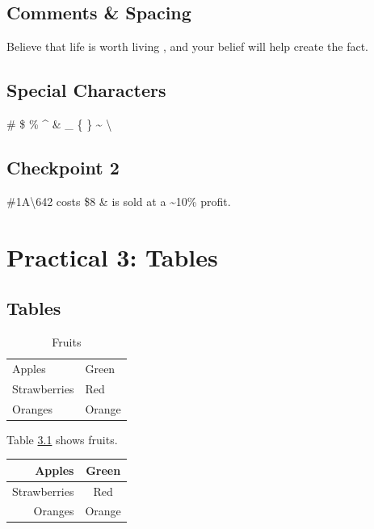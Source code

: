 \documentclass[a4paper, 12pt]{report}
\begin{document}
\vspace{12pt}

\section{Comments \& Spacing}

Believe that life is worth living%
, and your belief will help create the fact.


\section{Special Characters}

\#   \$  \%  \^{}  \&  \_  \{  \}  \~{}  \textbackslash


\section{Checkpoint 2}
\#1A\textbackslash642 costs \$8 \& is sold at a \~{}10\% profit.

\setcounter{chapter}{3}
\chapter*{Practical 3: Tables}

\section{Tables}

\begin{table}
\begin{tabular}{|l|l|}
Apples & Green\\
Strawberries & Red\\
Oranges & Orange\\
\end{tabular}
\caption{Fruits}
\label{table1}
\end{table}

Table \ref{table1} shows fruits.

\vspace{12pt}

\begin{tabular}{rc}
Apples & Green\\
\hline
Strawberries & Red\\
\cline{1-1}
Oranges & Orange\\
\end{tabular}
\end{document}

